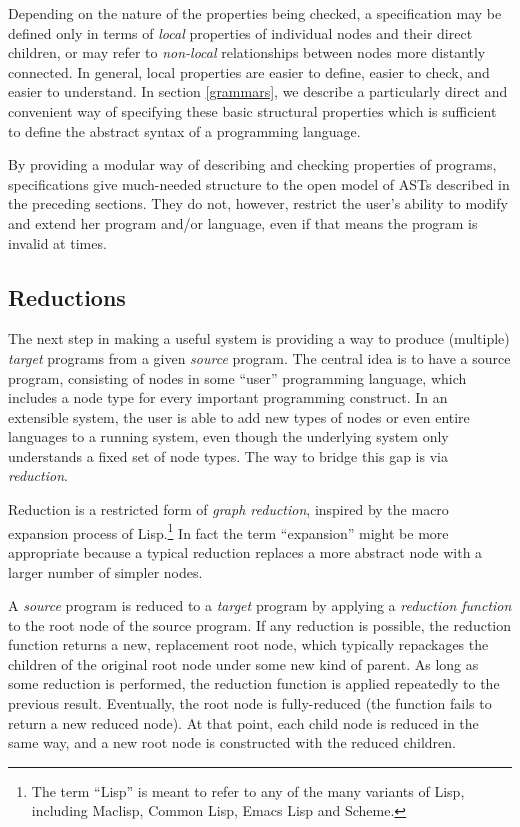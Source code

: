 Depending on the nature of the properties being checked, a specification may be defined only in terms of \emph{local} properties of individual nodes and their direct children, or may refer to \emph{non-local} relationships between nodes more distantly connected. In general, local properties are easier to define, easier to check, and easier to understand. In section \ref{grammars}, we describe a particularly direct and convenient way of specifying these basic structural properties which is sufficient to define the abstract syntax of a programming language.

By providing a modular way of describing and checking properties of programs, specifications give much-needed structure to the open model of ASTs described in the preceding sections. They do not, however, restrict the user's ability to modify and extend her program and/or language, even if that means the program is invalid at times. 


\subsection{Reductions}
\label{reduction}
The next step in making a useful system is providing a way to produce (multiple) \emph{target} programs from a given \emph{source} program. The central idea is to have a source program, consisting of nodes in some ``user'' programming language, which includes a node type for every important programming construct. In an extensible system, the user is able to add new types of nodes or even entire languages to a running system, even though the underlying system only understands a fixed set of node types. The way to bridge this gap is via \emph{reduction}.

Reduction is a restricted form of \emph{graph reduction}, inspired by the macro expansion process of Lisp.\footnote{The term ``Lisp'' is meant to refer to any of the many variants of Lisp, including Maclisp, Common Lisp, Emacs Lisp and Scheme.} In fact the term ``expansion'' might be more appropriate because a typical reduction replaces a more abstract node with a larger number of simpler nodes.

A \emph{source} program is reduced to a \emph{target} program by applying a \emph{reduction function} to the root node of the source program. If any reduction is possible, the reduction function returns a new, replacement root node, which typically repackages the children of the original root node under some new kind of parent. As long as some reduction is performed, the reduction function is applied repeatedly to the previous result. Eventually, the root node is fully-reduced (the function fails to return a new reduced node). At that point, each child node is reduced in the same way, and a new root node is constructed with the reduced children.

